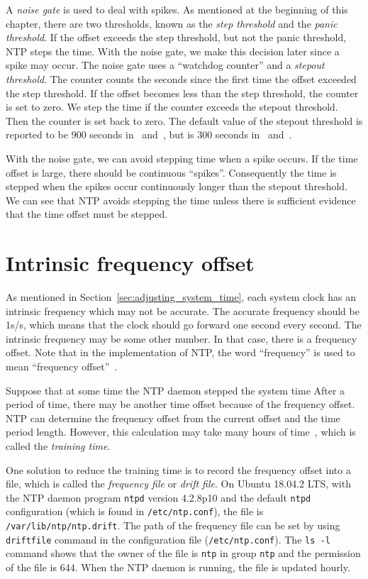 A \emph{noise gate} is used to deal with spikes. As mentioned at the beginning 
of this chapter, there are two thresholds, known as the \emph{step threshold}
and the
\emph{panic threshold}. If the offset exceeds the step threshold, but not the
panic threshold, NTP steps the time. With the noise gate, we make this decision
later since a spike may occur. The noise gate uses a ``watchdog counter'' and a
\emph{stepout threshold}. The counter counts the seconds since the first time
the offset exceeded the step threshold. If the offset becomes less than the step
threshold, the counter is set to zero. We step the time if the counter exceeds
the stepout threshold. Then the counter is set back to zero. The default value
of the stepout threshold is reported to be 900 seconds in~\cite{redbook}
and~\cite{rfc5905}, but is 300 seconds in~\cite{source_code}
and~\cite{clock_state_machine}. 

With the noise gate, we can avoid stepping time when a spike occurs. If the
time offset is large, there should be continuous ``spikes''. Consequently the
time is stepped when the spikes
occur continuously longer than the stepout threshold. We can see
that NTP avoids stepping the time unless there is sufficient evidence that the
time offset must be stepped. 

\section{Intrinsic frequency offset}%
\label{sec:intrinsic_frequency_offset}
As mentioned in Section~\ref{sec:adjusting_system_time}, each system clock has an
intrinsic frequency which may not be accurate. The accurate frequency should be
1s/s, which means that the clock should go forward one second every second. The
intrinsic frequency may be some other number. In that case, there is a
frequency offset. Note that in the implementation of NTP\null, the word
``frequency'' is used to mean ``frequency offset''~\cite{source_code}. 

Suppose that at some time the NTP daemon stepped the system time After a period
of time, there may be another time offset because of the frequency offset. NTP
can determine the frequency offset from the current offset and the time period
length.  However, this calculation may take many hours of time~\cite{redbook},
which is called the \emph{training time}. 

One solution to reduce the training time is to record the frequency offset into
a file, which is called the \emph{frequency file} or \emph{drift file}. On
Ubuntu 18.04.2 LTS, with the NTP
daemon program \verb|ntpd| version 4.2.8p10 and the default \verb|ntpd|
configuration (which is found in \verb|/etc/ntp.conf|), the file is
\verb|/var/lib/ntp/ntp.drift|. The path of the frequency file can be set by
using \verb|driftfile| command in the configuration file
(\verb|/etc/ntp.conf|). The \verb|ls -l| command shows that the owner of
the file is \verb|ntp| in group \verb|ntp| and the permission of the file is
644. When the NTP daemon is running, the file is updated hourly.

